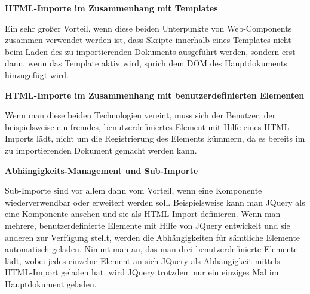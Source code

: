 \textbf{HTML-Importe im Zusammenhang mit Templates}

Ein sehr großer Vorteil, wenn diese beiden Unterpunkte von Web-Components zusammen verwendet werden ist, dass Skripte innerhalb eines Templates nicht beim Laden des zu importierenden Dokuments ausgeführt werden, sondern erst dann, wenn das Template aktiv wird, sprich dem DOM des Hauptdokuments hinzugefügt wird.

\textbf{HTML-Importe im Zusammenhang mit benutzerdefinierten Elementen}

Wenn man diese beiden Technologien vereint, muss sich der Benutzer, der beispielsweise ein fremdes, benutzerdefiniertes Element mit Hilfe eines HTML-Imports lädt, nicht um die Registrierung des Elements kümmern, da es bereits im zu importierenden Dokument gemacht werden kann.

\textbf{Abhängigkeits-Management und Sub-Importe}

Sub-Importe sind vor allem dann vom Vorteil, wenn eine Komponente wiederverwendbar oder erweitert werden soll. Beispielsweise kann man JQuery als eine Komponente ansehen und sie als HTML-Import definieren. Wenn man mehrere, benutzerdefinierte Elemente mit Hilfe von JQuery entwickelt und sie anderen zur Verfügung stellt, werden die Abhängigkeiten für sämtliche Elemente automatisch geladen. Nimmt man an, das man drei benutzerdefinierte Elemente lädt, wobei jedes einzelne Element an sich JQuery als Abhängigkeit mittels HTML-Import geladen hat, wird JQuery trotzdem nur ein einziges Mal im Hauptdokument geladen.